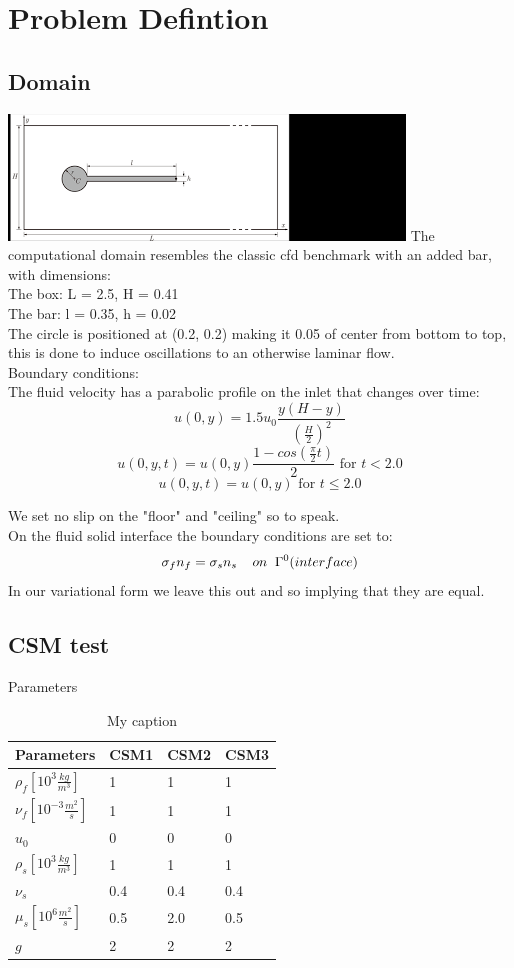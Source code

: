 



\section*{Problem Defintion}
\subsection*{Domain}
\includegraphics[scale=0.9]{geometry.png}
The computational domain resembles the classic cfd benchmark with an added bar, with dimensions: \\
The box: L = 2.5, H = 0.41 \\
The bar: l = 0.35, h = 0.02 \\
The circle is positioned at (0.2, 0.2) making it 0.05 of center from bottom to top, this is done to induce oscillations to an otherwise laminar flow.\\
Boundary conditions:\\
The fluid velocity has a parabolic profile on the inlet that changes over time:\\
$$ u(0,y) = 1.5u_0 \frac{y(H-y)}{(\frac{H}{2})^2}  $$
$$ u(0,y,t) = u(0,y)\frac{1-cos(\frac{\pi}{2}t)}{2} \text{  for  } t<2.0$$
$$ u(0,y,t) = u(0,y) \text{  for  } t \leq 2.0 $$

We set no slip on the "floor" and "ceiling" so to speak.\\
On the fluid solid interface the boundary conditions are set to:
$$  \sigma_f n_f = \sigma_s n_s \hspace{4mm} on  \hspace{2mm}\Gamma^0 (interface)   $$
In our variational form we leave this out and so implying that they are equal.

\subsection*{CSM test}
Parameters
\begin{table}[h]
\centering
\caption{My caption}
\label{my-label}
\begin{tabular}{|l|l|l|l|}
\hline
Parameters & CSM1 & CSM2 & CSM3 \\ \hline
$\rho_f[10^3 \frac{kg}{m^3}]$ & 1 & 1 & 1 \\ \hline
$\nu_f [10^{-3} \frac{m^2}{s}]$ & 1 & 1 & 1 \\ \hline
$u_0$ & 0 & 0 & 0 \\ \hline
$\rho_s[10^3 \frac{kg}{m^3}]$ & 1 & 1 & 1 \\ \hline
$\nu_s$ & 0.4 & 0.4 & 0.4 \\ \hline
$\mu_s[10^6 \frac{m^2}{s}]$ & 0.5 & 2.0 & 0.5 \\ \hline
$g $ & 2 & 2 & 2 \\ \hline
\end{tabular}
\end{table}


